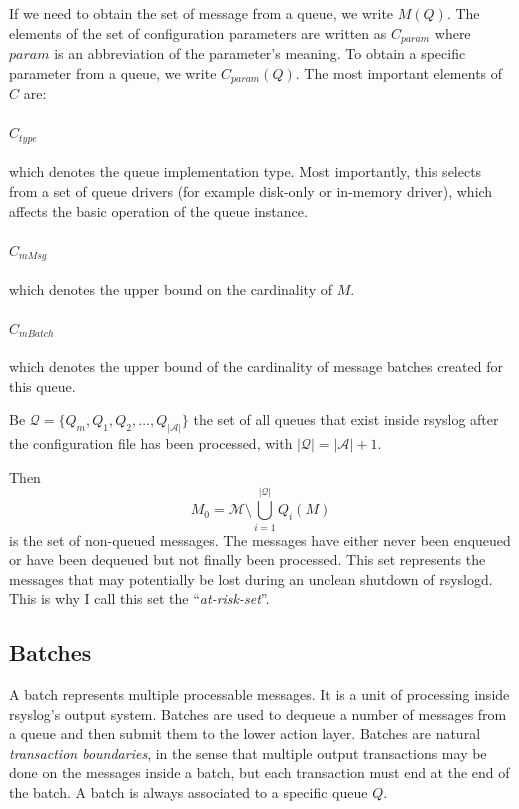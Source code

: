 \documentclass[a4paper,10pt]{article}
\newcommand{\MM}{\mathcal{M}}
\newcommand{\QQ}{\mathcal{Q}}
\newcommand{\AAA}{\mathcal{A}}
\begin{document}
If we need to obtain the set of message from a queue, we write $M(Q)$. The elements of the set of configuration parameters are written as $C_{param}$ where $param$ is an abbreviation of the parameter's meaning. To obtain a specific parameter from a queue, we write $C_{param}(Q)$. The most important elements of $C$ are:

\paragraph{$C_{type}$} which denotes the queue implementation type. Most importantly, this selects from a set of queue drivers (for example disk-only or in-memory driver), which affects the basic operation of the queue instance.

\paragraph{$C_{mMsg}$} which denotes the upper bound on the cardinality of $M$.

\paragraph{$C_{mBatch}$} which denotes the upper bound of the cardinality of message batches created for this queue.

Be $\QQ = \{Q_m, Q_1, Q_2, \ldots, Q_{|\AAA|}\}$ the set of all queues that exist inside rsyslog after the configuration file has been processed, with $|\QQ| = |\AAA| + 1$.

Then
$$M_0 = \MM \setminus \bigcup_{i=1}^{|\QQ|} Q_i(M)$$
is the set of non-queued messages. The messages have either never been enqueued or have been dequeued but not finally been processed. This set represents the messages that may potentially be lost during an unclean shutdown of rsyslogd. This is why I call this set the ``\emph{at-risk-set}''.


\subsection{Batches}
A batch represents multiple processable messages. It is a unit of processing inside rsyslog's output system. Batches are used to dequeue a number of messages from a queue and then submit them to the lower action layer. Batches are natural \emph{transaction boundaries}, in the sense that multiple output transactions may be done on the messages inside a batch, but each transaction must end at the end of the batch. A batch is always associated to a specific queue $Q$.
\end{document}
